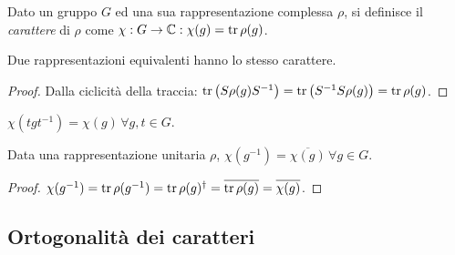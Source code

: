 \begin{definition}
	Dato un gruppo $ G $ ed una sua rappresentazione complessa $ \rho $, si definisce il \textit{carattere} di $ \rho $ come $ \chi : G \rightarrow \mathbb{C} : \chi(g) = \operatorname{tr}{\rho(g)} $.
\end{definition}

\begin{proposition}
	Due rappresentazioni equivalenti hanno lo stesso carattere.
\end{proposition}
\begin{proof}
	Dalla ciclicità della traccia: $ \operatorname{tr} \left( S \rho(g) S^{-1} \right) = \operatorname{tr} \left( S^{-1} S \rho(g) \right) = \operatorname{tr} \rho(g) $.
\end{proof}

\begin{propcorollary}\label{cahr-con}
	$ \chi(tgt^{-1}) = \chi(g) \,\forall g,t \in G $.
\end{propcorollary}

\begin{proposition}\label{char-herm}
	Data una rappresentazione unitaria $ \rho $, $ \chi(g^{-1}) = \overline{\chi(g)}\,\forall g \in G $.
\end{proposition}
\begin{proof}
	$ \chi(g^{-1}) = \operatorname{tr} \rho(g^{-1}) = \operatorname{tr} \rho(g)^{\dagger} = \overline{\operatorname{tr} \rho(g)} = \overline{\chi(g)} $.
\end{proof}

\subsection{Ortogonalità dei caratteri}

